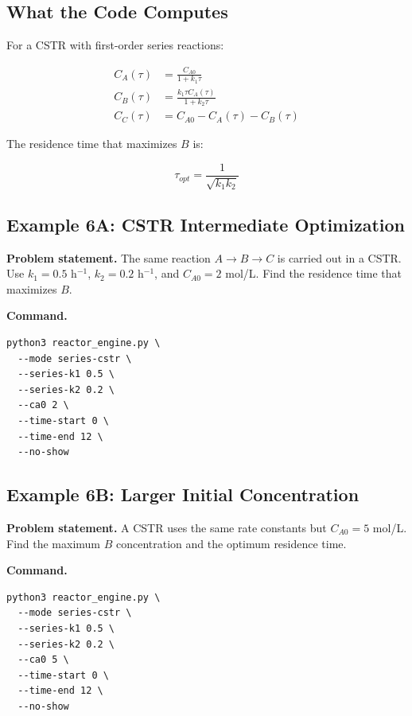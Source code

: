\documentclass[11pt]{article}
\begin{document}
\subsection{What the Code Computes}

For a CSTR with first-order series reactions:

\begin{align}
C_A(\tau) &= \frac{C_{A0}}{1+k_1\tau} \\
C_B(\tau) &= \frac{k_1\tau C_A(\tau)}{1+k_2\tau} \\
C_C(\tau) &= C_{A0}-C_A(\tau)-C_B(\tau)
\end{align}

The residence time that maximizes $B$ is:

\begin{equation}
\tau_{opt}=\frac{1}{\sqrt{k_1k_2}}
\end{equation}

\subsection{Example 6A: CSTR Intermediate Optimization}

\textbf{Problem statement.} The same reaction $A \to B \to C$ is carried out in a CSTR. Use $k_1=0.5$ h$^{-1}$, $k_2=0.2$ h$^{-1}$, and $C_{A0}=2$ mol/L. Find the residence time that maximizes $B$.

\textbf{Command.}

\begin{lstlisting}
python3 reactor_engine.py \
  --mode series-cstr \
  --series-k1 0.5 \
  --series-k2 0.2 \
  --ca0 2 \
  --time-start 0 \
  --time-end 12 \
  --no-show
\end{lstlisting}

\subsection{Example 6B: Larger Initial Concentration}

\textbf{Problem statement.} A CSTR uses the same rate constants but $C_{A0}=5$ mol/L. Find the maximum $B$ concentration and the optimum residence time.

\textbf{Command.}

\begin{lstlisting}
python3 reactor_engine.py \
  --mode series-cstr \
  --series-k1 0.5 \
  --series-k2 0.2 \
  --ca0 5 \
  --time-start 0 \
  --time-end 12 \
  --no-show
\end{lstlisting}
\end{document}
